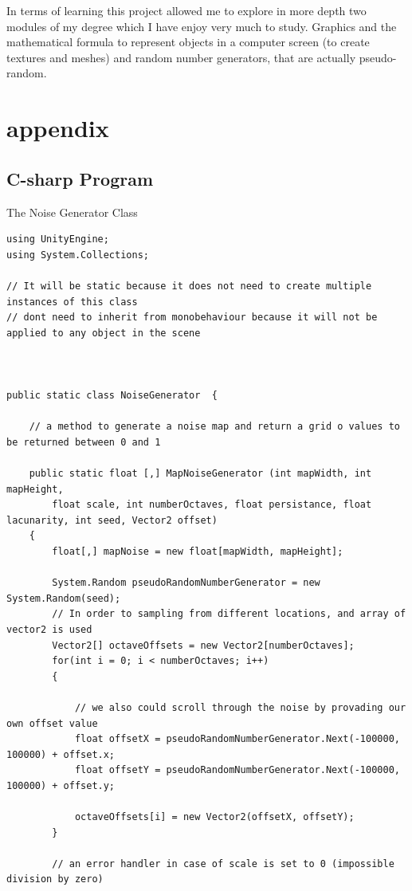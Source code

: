 \documentclass[a4paper,12pt]{book}
\begin{document}
In terms of learning this project allowed me to explore in more depth two modules of my degree which I have enjoy very much to study. Graphics and the mathematical formula to represent objects in a computer screen (to create textures and meshes) and random number generators, that are actually pseudo-random.



\part{appendix}
\chapter{C-sharp Program}


 The Noise Generator Class
 
\begin{lstlisting}
using UnityEngine;
using System.Collections;

// It will be static because it does not need to create multiple instances of this class
// dont need to inherit from monobehaviour because it will not be applied to any object in the scene


    
public static class NoiseGenerator  {

    // a method to generate a noise map and return a grid o values to be returned between 0 and 1

    public static float [,] MapNoiseGenerator (int mapWidth, int mapHeight, 
        float scale, int numberOctaves, float persistance, float lacunarity, int seed, Vector2 offset)
    {
        float[,] mapNoise = new float[mapWidth, mapHeight];

        System.Random pseudoRandomNumberGenerator = new System.Random(seed);
        // In order to sampling from different locations, and array of vector2 is used
        Vector2[] octaveOffsets = new Vector2[numberOctaves];
        for(int i = 0; i < numberOctaves; i++)
        {

            // we also could scroll through the noise by provading our own offset value 
            float offsetX = pseudoRandomNumberGenerator.Next(-100000, 100000) + offset.x;
            float offsetY = pseudoRandomNumberGenerator.Next(-100000, 100000) + offset.y;

            octaveOffsets[i] = new Vector2(offsetX, offsetY);
        }

        // an error handler in case of scale is set to 0 (impossible division by zero)


\end{lstlisting}
\end{document}
